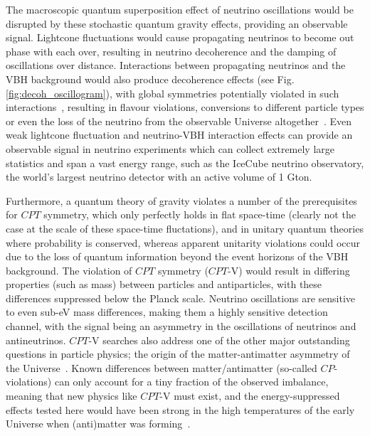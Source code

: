 \documentclass[a4paper,11pt]{article}
\begin{document}
The macroscopic quantum superposition effect of neutrino oscillations would be disrupted by these stochastic quantum gravity effects, providing an observable signal. Lightcone fluctuations would cause propagating neutrinos to become out phase with each over, resulting in neutrino decoherence and the damping of oscillations over distance. Interactions between propagating neutrinos and the VBH background would also produce decoherence effects (see Fig. \ref{fig:decoh_oscillogram}), with global symmetries potentially violated in such interactions~\cite{Anchordoqui:2005gj, Harlow:2018jwu, PhysRevD.102.115003, Hellmann:2021jyz}, resulting in flavour violations, conversions to different particle types or even the loss of the neutrino from the observable Universe altogether~\cite{Anchordoqui:2005gj, Anchordoqui:2006xv, Witten:2017hdv}. Even weak lightcone fluctuation and neutrino-VBH interaction effects can provide an observable signal in neutrino experiments which can collect extremely large statistics and span a vast energy range, such as the IceCube neutrino observatory, the world's largest neutrino detector with an active volume of 1 Gton.

Furthermore, a quantum theory of gravity violates a number of the prerequisites for $CPT$ symmetry, which only perfectly holds in flat space-time (clearly not the case at the scale of these space-time fluctations), and in unitary quantum theories where probability is conserved, whereas apparent unitarity violations could occur due to the loss of quantum information beyond the event horizons of the VBH background. The violation of $CPT$ symmetry ($CPT$-V) would result in differing properties (such as mass) between particles and antiparticles, with these differences suppressed below the Planck scale. Neutrino oscillations are sensitive to even sub-eV mass differences, making them a highly sensitive detection channel, with the signal being an asymmetry in the oscillations of neutrinos and antineutrinos. $CPT$-V searches also address one of the other major outstanding questions in particle physics; the origin of the matter-antimatter asymmetry of the Universe~\cite{Sakharov_1991}. Known differences between matter/antimatter (so-called $CP$-violations) can only account for a tiny fraction of the observed imbalance, meaning that new physics like $CPT$-V must exist, and the energy-suppressed effects tested here would have been strong in the high temperatures of the early Universe when (anti)matter was forming~\cite{Mavromatos:2017cxr, hep-ph/9809542, Ellis:2013gca}. \\
\end{document}
